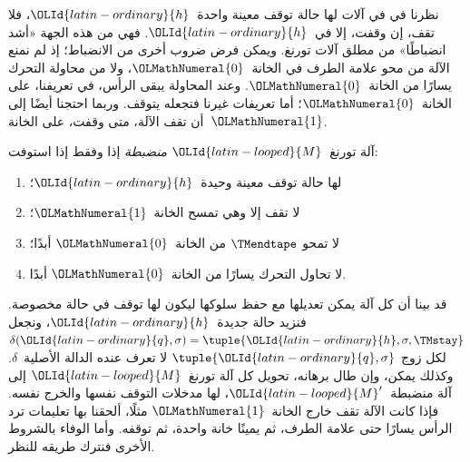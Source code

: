 \documentclass[../../../include/open-logic-section]{subfiles}
\begin{document}

\begin{explain}
نظرنا في  في آلات لها حالة توقف معينة واحدة~$\OLId{latin-ordinary}{h}$، فلا تقف، إن وقفت، إلا في~$\OLId{latin-ordinary}{h}$. فهي من هذه الجهة «أشد انضباطًا» من مطلق آلات تورنغ. ويمكن فرض ضروب أخرى من الانضباط؛ إذ لم نمنع الآلة من محو علامة الطرف في الخانة~$\OLMathNumeral{0}$، ولا من محاولة التحرك يسارًا من الخانة~$\OLMathNumeral{0}$. وعند المحاولة يبقى الرأس، في تعريفنا، على الخانة~$\OLMathNumeral{0}$؛ أما تعريفات غيرنا فتجعله يتوقف. وربما احتجنا أيضًا إلى أن تقف الآلة، متى وقفت، على الخانة~$\OLMathNumeral{1}$.
\end{explain}

\begin{defn}
آلة تورنغ~$\OLId{latin-looped}{M}$ \emph{منضبطة} إذا وفقط إذا استوفت:
\begin{enumerate}
\item لها حالة توقف معينة وحيدة~$\OLId{latin-ordinary}{h}$؛
\item لا تقف إلا وهي تمسح الخانة~$\OLMathNumeral{1}$؛
\item لا تمحو $\TMendtape$ من الخانة~$\OLMathNumeral{0}$ أبدًا؛
\item لا تحاول التحرك يسارًا من الخانة~$\OLMathNumeral{0}$ أبدًا.
\end{enumerate}
\end{defn}

\begin{explain}
قد بينا أن كل آلة يمكن تعديلها مع حفظ سلوكها ليكون لها توقف في حالة مخصوصة. فنزيد حالة جديدة~$\OLId{latin-ordinary}{h}$، ونجعل $\delta(\OLId{latin-ordinary}{q},\sigma)=\tuple{\OLId{latin-ordinary}{h},\sigma,\TMstay}$ لكل زوج $\tuple{\OLId{latin-ordinary}{q},\sigma}$ لا تعرف عنده الدالة الأصلية~$\delta$. وكذلك يمكن، وإن طال برهانه، تحويل كل آلة تورنغ~$\OLId{latin-looped}{M}$ إلى آلة منضبطة~$\OLId{latin-looped}{M}'$، لها مدخلات التوقف نفسها والخرج نفسه. فإذا كانت الآلة تقف خارج الخانة~$\OLMathNumeral{1}$ مثلًا، ألحقنا بها تعليمات ترد الرأس يسارًا حتى علامة الطرف، ثم يمينًا خانة واحدة، ثم توقفه. وأما الوفاء بالشروط الأخرى فنترك طريقه للنظر.
\end{explain}
\end{document}
